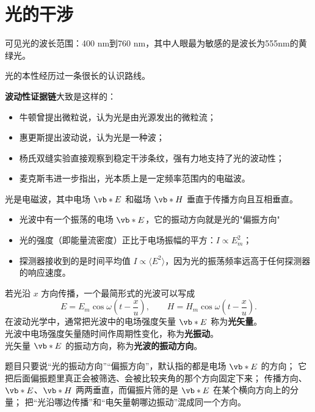 
\chapter{光的干涉}

\begin{definition}[可见光]
可见光的波长范围：400 nm到760 nm，其中人眼最为敏感的是波长为555nm的黄绿光。
\end{definition}

光的本性经历过一条很长的认识路线。

\textbf{波动性证据链}大致是这样的：
\begin{itemize}
 \item 牛顿曾提出微粒说，认为光是由光源发出的微粒流；
 \item 惠更斯提出波动说，认为光是一种波；
 \item 杨氏双缝实验直接观察到稳定干涉条纹，强有力地支持了光的波动性；
 \item 麦克斯韦进一步指出，光本质上是一定频率范围内的电磁波。
\end{itemize}
光是电磁波，其中电场 \(\vb*{E}\) 和磁场 \(\vb*{H}\) 垂直于传播方向且互相垂直。
\begin{itemize}
 \item 光波中有一个振荡的电场 \(\vb*{E}\)，它的振动方向就是光的"偏振方向"
 \item  光的强度（即能量流密度）正比于电场振幅的平方：\(I\propto E_m^2\)；
 \item 探测器接收到的是时间平均值 \(I\propto\langle E^2\rangle\)，因为光的振荡频率远高于任何探测器的响应速度。
\end{itemize}

\begin{definition}
若光沿 \(x\) 方向传播，一个最简形式的光波可以写成
\[
E=E_m\cos\omega\left(t-\frac{x}{u}\right),\qquad
H=H_m\cos\omega\left(t-\frac{x}{u}\right).
\]
在波动光学中，通常把光波中的电场强度矢量 \(\vb*{E}\) 称为\textbf{光矢量}。\\
光波中电场强度矢量随时间作周期性变化，称为\textbf{光振动}。\\
光矢量 \(\vb*{E}\) 的振动方向，称为\textbf{光波的振动方向}。
\end{definition}

\begin{note}
 题目只要说“光的振动方向”“偏振方向”，默认指的都是电场 \(\vb*{E}\) 的方向； 它把后面偏振题里真正会被筛选、会被比较夹角的那个方向固定下来； 传播方向、\(\vb*{E}\)、\(\vb*{H}\) 两两垂直，而偏振片筛的是 \(\vb*{E}\) 在某个横向方向上的分量； 把“光沿哪边传播”和“电矢量朝哪边振动”混成同一个方向。
\end{note}


